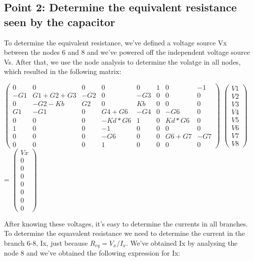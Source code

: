 \subsection{Point 2: Determine the equivalent resistance seen by the capacitor}

To determine the equivalent resistance, we've defined a voltage source Vx between the nodes 6 and 8 and we've powered off the independent voltage source Vs. After that, we use the node analysis to determine the volatge in all nodes, which resulted in the following matrix:

$\begin{pmatrix}
0 & 0 & 0 & 0 & 0 & 1 & 0 & -1\\
-G1 & G1+G2+G3 & -G2 & 0 & -G3 & 0 & 0 & 0\\
0 & -G2-Kb & G2 & 0 & Kb & 0 & 0 & 0 \\
G1 & -G1 & 0 & G4+G6 & -G4 & 0 & -G6 & 0\\
0 & 0 & 0 & -Kd*G6 & 1 & 0 & Kd*G6 & 0 \\
1 & 0 & 0 & -1 & 0 & 0 & 0 & 0\\
0 & 0 & 0 & -G6 & 0 & 0 & G6+G7 & -G7  \\ 
0 & 0 & 0 & 1 & 0 & 0 & 0 & 0
\end{pmatrix}$
$\begin{pmatrix}
V1\\
V2\\
V3\\
V4\\
V5\\
V6\\
V7\\
V8
\end{pmatrix}$
=
$\begin{pmatrix}
Vx\\
0\\
0\\
0\\
0\\
0\\
0\\
0
\end{pmatrix}$

After knowing these voltages, it's easy to determine the currents in all branches. To determine the equavalent resistance we need to determine the current in the branch 6-8, Ix, just because $R_{eq}=V_{x}/I_{x}$. We've obtained Ix by analysing the node 8 and we've obtained the following expression for Ix:


